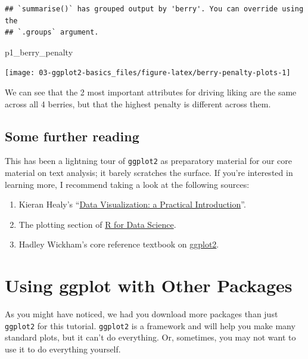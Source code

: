 \documentclass[
]{book}
\newenvironment{Shaded}{\begin{snugshade}}{\end{snugshade}}
\newcommand{\NormalTok}[1]{#1}
\providecommand{\tightlist}{%
  \setlength{\itemsep}{0pt}\setlength{\parskip}{0pt}}
\begin{document}
\begin{verbatim}
## `summarise()` has grouped output by 'berry'. You can override using the
## `.groups` argument.
\end{verbatim}

\begin{Shaded}
\begin{Highlighting}[]
\NormalTok{p1\_berry\_penalty}
\end{Highlighting}
\end{Shaded}

\begin{center}\texttt{[image: 03-ggplot2-basics\_files/figure-latex/berry-penalty-plots-1]} \end{center}

We can see that the 2 most important attributes for driving liking are the same across all 4 berries, but that the highest penalty is different across them.

\hypertarget{some-further-reading}{%
\section{Some further reading}\label{some-further-reading}}

This has been a lightning tour of \texttt{ggplot2} as preparatory material for our core material on text analysis; it barely scratches the surface. If you're interested in learning more, I recommend taking a look at the following sources:

\begin{enumerate}
\def\labelenumi{\arabic{enumi}.}
\tightlist
\item
  Kieran Healy's ``\href{https://socviz.co/index.html\#preface}{Data Visualization: a Practical Introduction}''.
\item
  The plotting section of \href{https://r4ds.had.co.nz/data-visualisation.html}{R for Data Science}.
\item
  Hadley Wickham's core reference textbook on \href{https://ggplot2-book.org/}{ggplot2}.
\end{enumerate}

\hypertarget{using-ggplot-with-other-packages}{%
\chapter{Using ggplot with Other Packages}\label{using-ggplot-with-other-packages}}

As you might have noticed, we had you download more packages than just \texttt{ggplot2} for this tutorial. \texttt{ggplot2} is a framework and will help you make many standard plots, but it can't do everything. Or, sometimes, you may not want to use it to do everything yourself.
\end{document}
